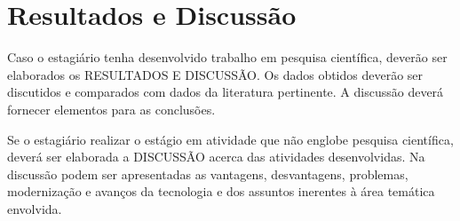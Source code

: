 \chapter[Resultados e Discussão]{Resultados e Discussão}

Caso o estagiário tenha desenvolvido trabalho em pesquisa científica, deverão ser 
elaborados os RESULTADOS E DISCUSSÃO. Os dados obtidos deverão ser discutidos e 
comparados com dados da literatura pertinente. A discussão deverá fornecer elementos para
as conclusões.

Se o estagiário realizar o estágio em atividade que não englobe pesquisa científica, deverá 
ser elaborada a DISCUSSÃO acerca das atividades desenvolvidas. Na discussão podem ser 
apresentadas as vantagens, desvantagens, problemas, modernização e avanços da tecnologia 
e dos assuntos inerentes à área temática envolvida.
